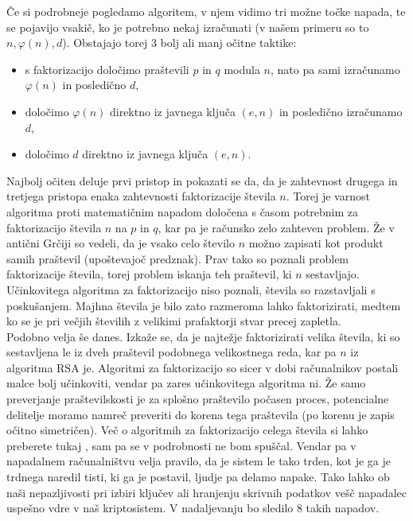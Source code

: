 \documentclass[a4paper, 12pt]{article} %
\begin{document}
Če si podrobneje pogledamo algoritem, v njem vidimo tri možne točke napada, te se pojavijo vsakič, ko je potrebno nekaj izračunati (v našem primeru so to $n, \varphi (n), d$). Obstajajo torej 3 bolj ali manj očitne taktike:
\begin{itemize}[label=]
\item s faktorizacijo določimo praštevili $p$ in $q$ modula $n$, nato pa sami izračunamo $\varphi (n)$ in posledično $d$,
\item določimo $\varphi (n)$ direktno iz javnega ključa $(e, n)$ in posledično izračunamo $d$,
\item določimo $d$ direktno iz javnega ključa $(e, n)$. \\
\end{itemize}

Najbolj očiten deluje prvi pristop in pokazati se da, da je zahtevnost drugega in tretjega pristopa enaka zahtevnosti faktorizacije števila $n$. Torej je varnost algoritma proti matematičnim napadom določena s časom potrebnim za faktorizacijo števila $n$ na $p$ in $q$, kar pa je računsko zelo zahteven problem.
\newline
\newline
Že v antični Grčiji so vedeli, da je vsako celo število $n$ možno zapisati kot produkt samih praštevil (upoštevajoč predznak). Prav tako so poznali problem faktorizacije števila, torej problem iskanja teh praštevil, ki $n$ sestavljajo. Učinkovitega algoritma za faktorizacijo niso poznali, števila so razstavljali s poskušanjem. Majhna števila je bilo zato razmeroma lahko faktorizirati, medtem ko se je pri večjih številih z velikimi prafaktorji stvar precej zapletla.\\
Podobno velja še danes. Izkaže se, da je najtežje faktorizirati velika števila, ki so sestavljena le iz dveh praštevil podobnega velikostnega reda, kar pa $n$ iz algoritma RSA je. Algoritmi za faktorizacijo so sicer v dobi računalnikov postali malce bolj učinkoviti, vendar pa zares učinkovitega algoritma ni. Že samo preverjanje praštevilskosti je za splošno praštevilo počasen proces, potencialne delitelje moramo namreč preveriti do korena tega praštevila (po korenu je zapis očitno simetričen).
\newline
\newline
Več o algoritmih za faktorizacijo celega števila si lahko preberete tukaj \cite{faktorizacija}, sam pa se v podrobnosti ne bom spuščal.
\newline
\newline
Vendar pa v napadalnem računalništvu velja pravilo, da je sistem le tako trden, kot je ga je trdnega naredil tisti, ki ga je postavil, ljudje pa delamo napake. Tako lahko ob naši nepazljivosti pri izbiri ključev ali hranjenju skrivnih podatkov vešč napadalec uspešno vdre v naš kriptosistem. V nadaljevanju bo sledilo $8$ takih napadov.
\end{document}
